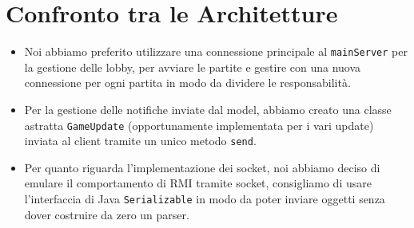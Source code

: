\documentclass{article}
\begin{document}
    \section{Confronto tra le Architetture}
    \begin{itemize}
        \item Noi abbiamo preferito utilizzare una connessione principale al \texttt{mainServer} per la gestione delle lobby, per avviare le partite e gestire con una nuova connessione per ogni partita in modo da dividere le responsabilità.
        \item Per la gestione delle notifiche inviate dal model, abbiamo creato una classe astratta \texttt{GameUpdate} (opportunamente implementata per i vari update) inviata al client tramite un unico metodo \texttt{send}.
        \item Per quanto riguarda l'implementazione dei socket, noi abbiamo deciso di emulare il comportamento di RMI tramite socket, consigliamo di usare l'interfaccia di Java \texttt{Serializable} in modo da poter inviare oggetti senza dover costruire da zero un parser.
    \end{itemize}
\end{document}
